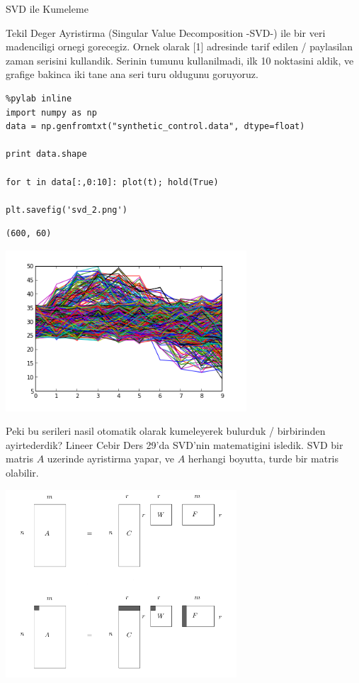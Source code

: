 \documentclass[12pt,fleqn]{article}\usepackage{../common}
\begin{document}
SVD ile Kumeleme

Tekil Deger Ayristirma (Singular Value Decomposition -SVD-) ile bir veri
madenciligi ornegi gorecegiz. Ornek olarak [1] adresinde tarif edilen /
paylasilan zaman serisini kullandik. Serinin tumunu kullanilmadi, ilk 10
noktasini aldik, ve grafige bakinca iki tane ana seri turu oldugunu
goruyoruz.

\begin{verbatim}
%pylab inline
import numpy as np
data = np.genfromtxt("synthetic_control.data", dtype=float)

print data.shape

for t in data[:,0:10]: plot(t); hold(True)

plt.savefig('svd_2.png')
\end{verbatim}

\begin{verbatim}
(600, 60)
\end{verbatim}

\includegraphics[height=6cm]{svd_2.png}

Peki bu serileri nasil otomatik olarak kumeleyerek bulurduk / birbirinden
ayirtederdik?  Lineer Cebir Ders 29'da SVD'nin matematigini
isledik. SVD bir matris $A$ uzerinde ayristirma yapar, ve $A$ herhangi
boyutta, turde bir matris olabilir.

\includegraphics[height=7cm]{svd_1.png}
\end{document}
